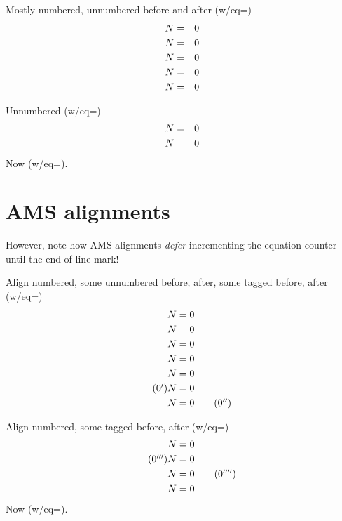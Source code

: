 \documentclass{article}
\begin{document}
Mostly numbered, unnumbered before and after (w/eq=\theequation)
\begin{eqnarray}
N&=&\mbox{\theequation} \\
N&=&\mbox{\theequation} \\
\nonumber N&=&\mbox{\theequation} \\
N&=&\mbox{\theequation} \nonumber\\
N&=&\mbox{\theequation}
\end{eqnarray}

Unnumbered (w/eq=\theequation)
\begin{eqnarray*}
N&=&\mbox{\theequation} \\
N&=&\mbox{\theequation}
\end{eqnarray*}
Now  (w/eq=\theequation).

\section{AMS alignments}
However, note how AMS alignments \emph{defer} incrementing the equation counter
until the end of line mark!

Align numbered, some unnumbered before, after, some tagged before, after (w/eq=\theequation)
\begin{align}
N&=\mbox{\theequation} \\
N&=\mbox{\theequation} \\
\nonumber N&=\mbox{\theequation} \\
N&=\mbox{\theequation} \nonumber\\
N&=\mbox{\theequation} \\
\tag{\theequation$'$} N&=\mbox{\theequation} \\
N&=\mbox{\theequation} \tag{\theequation$''$}
\end{align}

Align numbered, some tagged before, after (w/eq=\theequation)
\begin{align*}
N&=\mbox{\theequation} \\
\tag{\theequation$'''$} N&=\mbox{\theequation} \\
N&=\mbox{\theequation} \tag{\theequation$''''$}\\
N&=\mbox{\theequation} \\
\end{align*}
Now (w/eq=\theequation).
\end{document}
